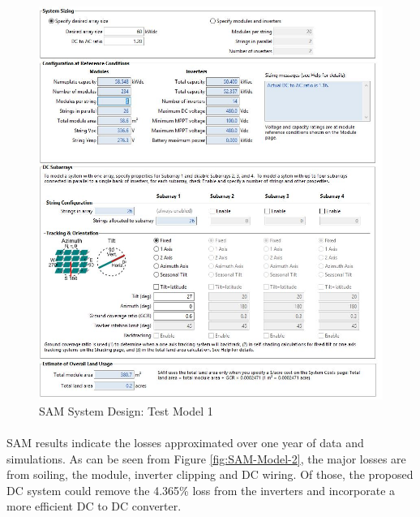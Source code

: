 \begin{figure}[H]
\hfill\includegraphics[width = 120mm]{images/sam-1-system-design}\hspace*{\fill}
\caption{SAM System Design: Test Model 1} 
\label{fig:SAM-Model-1}
\end{figure}      

\paragraph{}
SAM results indicate the losses approximated over one year of data and simulations. As can be seen from Figure \ref{fig:SAM-Model-2}, the major losses are from soiling, the module, inverter clipping and DC wiring. Of those, the proposed DC system could remove the 4.365\% loss from the inverters and incorporate a more efficient DC to DC converter.   

